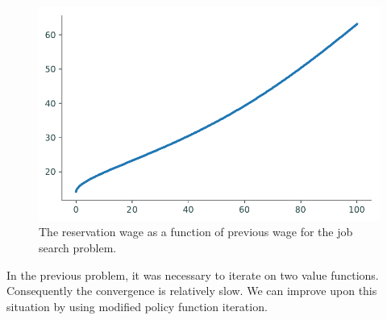 \begin{figure}
\includegraphics[width=\textwidth]{figures/reservation_wage.pdf}
\caption{The reservation wage as a function of previous wage for the job search problem.}
\label{fig:res_wage}
\end{figure}

In the previous problem, it was necessary to iterate on two value functions.
Consequently the convergence is relatively slow.
We can improve upon this situation by using modified policy function iteration.

